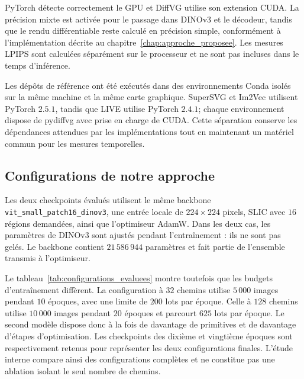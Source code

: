 \documentclass[12pt, a4paper, oneside]{report}
\begin{document}
PyTorch détecte correctement le GPU et DiffVG utilise son extension CUDA. La précision mixte est activée pour le passage dans DINOv3 et le décodeur, tandis que le rendu différentiable reste calculé en précision simple, conformément à l'implémentation décrite au chapitre~\ref{chap:approche_proposee}. Les mesures LPIPS sont calculées séparément sur le processeur et ne sont pas incluses dans le temps d'inférence.

Les dépôts de référence ont été exécutés dans des environnements Conda isolés sur la même machine et la même carte graphique. SuperSVG et Im2Vec utilisent PyTorch $2.5.1$, tandis que LIVE utilise PyTorch $2.4.1$; chaque environnement dispose de pydiffvg avec prise en charge de CUDA. Cette séparation conserve les dépendances attendues par les implémentations tout en maintenant un matériel commun pour les mesures temporelles.

\subsection{Configurations de notre approche}

Les deux checkpoints évalués utilisent le même backbone \texttt{vit\_small\_patch16\_dinov3}, une entrée locale de $224 \times 224$ pixels, SLIC avec $16$ régions demandées, ainsi que l'optimiseur AdamW. Dans les deux cas, les paramètres de DINOv3 sont ajustés pendant l'entraînement : ils ne sont pas gelés. Le backbone contient $21\,586\,944$ paramètres et fait partie de l'ensemble transmis à l'optimiseur.

Le tableau~\ref{tab:configurations_evaluees} montre toutefois que les budgets d'entraînement diffèrent. La configuration à $32$ chemins utilise $5\,000$ images pendant $10$ époques, avec une limite de $200$ lots par époque. Celle à $128$ chemins utilise $10\,000$ images pendant $20$ époques et parcourt $625$ lots par époque. Le second modèle dispose donc à la fois de davantage de primitives et de davantage d'étapes d'optimisation. Les checkpoints des dixième et vingtième époques sont respectivement retenus pour représenter les deux configurations finales. L'étude interne compare ainsi des configurations complètes et ne constitue pas une ablation isolant le seul nombre de chemins.
\end{document}
